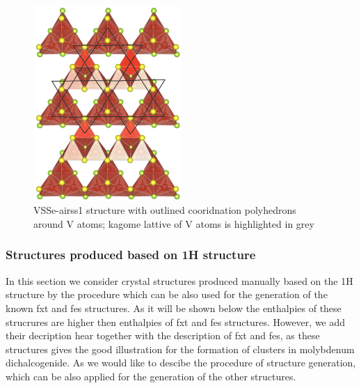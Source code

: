 \documentclass[a4paperm]{article}
\begin{document}
\begin{figure}[H]
        \includegraphics[width=0.5\textwidth]{airss1_v_poly.png}
        \caption{VSSe-airss1 structure with outlined cooridnation polyhedrons around V atoms; kagome lattive of V atoms is highlighted in grey}
\label{airss1_poly}
\end{figure}


\subsubsection{Structures produced based on 1H structure}

In this section we consider crystal structures produced manually based on the 1H structure by the procedure which can be also used for the generation of the known fxt and fes structures.
As it will be shown below the enthalpies of these strucrures are higher then enthalpies of fxt and fes structures.
However, we add their decription hear together with the description of fxt and fes, as these structures gives the good illustration for the formation of clusters in molybdenum dichalcogenide.
As we would like to descibe the procedure of structure generation, which can be also applied for the generation of the other structures.
\end{document}
